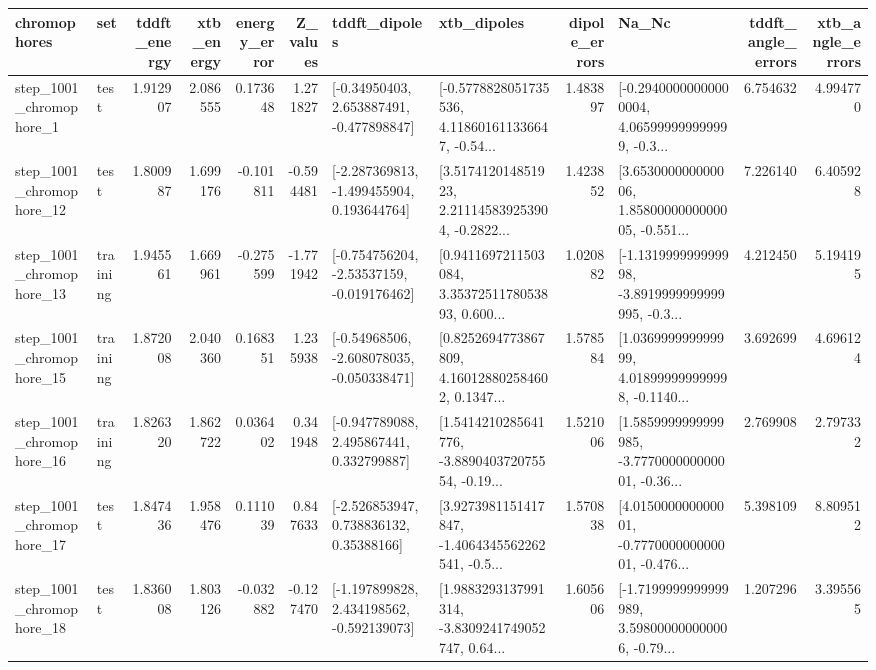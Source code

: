 \begin{tabular}{llrrrrllrlrr}
\toprule
             chromophores &       set &  tddft\_energy &  xtb\_energy &  energy\_error &  Z\_values &                               tddft\_dipoles &                                        xtb\_dipoles &  dipole\_errors &                                              Na\_Nc &  tddft\_angle\_errors &  xtb\_angle\_errors \\
\midrule
  step\_1001\_chromophore\_1 &      test &      1.912907 &    2.086555 &      0.173648 &  1.271827 &    [-0.34950403, 2.653887491, -0.477898847] &  [-0.5778828051735536, 4.118601611336647, -0.54... &       1.483897 &  [-0.29400000000000004, 4.065999999999999, -0.3... &            6.754632 &          4.994770 \\
 step\_1001\_chromophore\_12 &      test &      1.800987 &    1.699176 &     -0.101811 & -0.594481 &   [-2.287369813, -1.499455904, 0.193644764] &  [3.517412014851923, 2.211145839253904, -0.2822... &       1.423852 &  [3.653000000000006, 1.8580000000000005, -0.551... &            7.226140 &          6.405928 \\
 step\_1001\_chromophore\_13 &  training &      1.945561 &    1.669961 &     -0.275599 & -1.771942 &   [-0.754756204, -2.53537159, -0.019176462] &  [0.9411697211503084, 3.3537251178053893, 0.600... &       1.020882 &  [-1.131999999999998, -3.8919999999999995, -0.3... &            4.212450 &          5.194195 \\
 step\_1001\_chromophore\_15 &  training &      1.872008 &    2.040360 &      0.168351 &  1.235938 &   [-0.54968506, -2.608078035, -0.050338471] &  [0.8252694773867809, 4.160128802584602, 0.1347... &       1.578584 &  [1.036999999999999, 4.018999999999998, -0.1140... &            3.692699 &          4.696124 \\
 step\_1001\_chromophore\_16 &  training &      1.826320 &    1.862722 &      0.036402 &  0.341948 &    [-0.947789088, 2.495867441, 0.332799887] &  [1.5414210285641776, -3.889040372075554, -0.19... &       1.521006 &  [1.5859999999999985, -3.777000000000001, -0.36... &            2.769908 &          2.797332 \\
 step\_1001\_chromophore\_17 &      test &      1.847436 &    1.958476 &      0.111039 &  0.847633 &     [-2.526853947, 0.738836132, 0.35388166] &  [3.9273981151417847, -1.4064345562262541, -0.5... &       1.570838 &  [4.015000000000001, -0.777000000000001, -0.476... &            5.398109 &          8.809512 \\
 step\_1001\_chromophore\_18 &      test &      1.836008 &    1.803126 &     -0.032882 & -0.127470 &   [-1.197899828, 2.434198562, -0.592139073] &  [1.9883293137991314, -3.8309241749052747, 0.64... &       1.605606 &  [-1.7199999999999989, 3.598000000000006, -0.79... &            1.207296 &          3.395565 \\

\end{tabular}
